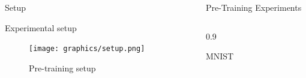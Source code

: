 \documentclass[final]{beamer}
\newlength{\sepwid}
\newlength{\onecolwid}
\newlength{\threecolwid}
\begin{document}
\begin{frame}[t]
\begin{columns}[t]
\begin{column}{\onecolwid}
\begin{alertblock}{Setup}
\begin{block}{Experimental setup}

\begin{figure}
\texttt{[image: graphics/setup.png]}
\caption{Pre-training setup}
\end{figure}

\end{block}

\end{alertblock}



\end{column} %


\begin{column}{\sepwid}\end{column} %


\begin{column}{\threecolwid}


\begin{alertblock}{Pre-Training Experiments}

\centering

\begin{columns}[t, totalwidth=0.9\threecolwid] %




\begin{column}{0.9\onecolwid} %
\begin{block}{MNIST}

\begin{figure}


\end{figure}
\end{block}
\end{column}
\end{columns}
\end{alertblock}
\end{column}
\end{columns}
\end{frame}
\end{document}
